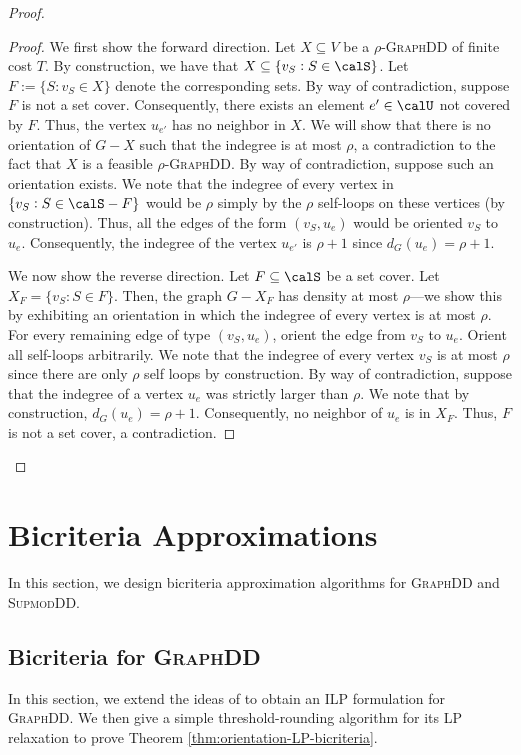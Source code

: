 \documentclass{article}
\newcommand{\densitydeletionset}{\textsc{GraphDD}\xspace}
\newcommand{\supmoddensitydeletionset}{\textsc{SupmodDD}\xspace}
\begin{document}
\begin{proof}
\begin{proof}
    We first show the forward direction. Let $X \subseteq V$ be a $\rho$-\densitydeletionset of finite cost $T$. By construction, we have that $X \subseteq \{v_S : S \in \calS\}$. Let $F := \{S : v_S \in X\}$ denote the corresponding sets. By way of contradiction, suppose $F$ is not a set cover. Consequently, there exists an element $e' \in \calU$ not covered by $F$. Thus, the vertex $u_{e'}$ has no neighbor in $X$. We will show that there is no orientation of $G - X$ such that the indegree is at most $\rho$, a contradiction to the fact that $X$ is a feasible $\rho$-\densitydeletionset. By way of contradiction, suppose such an orientation exists. We note that the indegree of every vertex in $\{v_S : S \in \calS - F\}$ would be $\rho$ simply by the $\rho$ self-loops on these vertices (by construction). Thus, all the edges of the form $(v_S, u_e)$ would be oriented $v_S$ to $u_e$. Consequently, the indegree of the vertex $u_{e'}$ is $\rho+1$ since $d_G(u_e) = \rho+1$.

    We now show the reverse direction. Let $F \subseteq \calS$ be a set cover. Let $X_F = \{v_S : S \in F\}$. Then, the graph $G - X_F$ has density at most $\rho$---we show this by exhibiting an orientation in which the indegree of every vertex is at most $\rho$. For every remaining edge of type $(v_S, u_e)$, orient the edge from $v_S$ to $u_e$. Orient all self-loops arbitrarily. We note that the indegree of every vertex $v_S$ is at most $\rho$ since there are only $\rho$ self loops by construction. By way of contradiction, suppose that the indegree of a vertex $u_e$ was strictly larger than $\rho$. We note that by construction, $d_G(u_e) = \rho+1$. Consequently, no neighbor of $u_e$ is in $X_F$. Thus, $F$ is not a set cover, a contradiction.
\end{proof}
\end{proof}
\fi

%
 \section{Bicriteria Approximations}\label{sec:bicriteria-algorithm}
In this section, we design bicriteria approximation algorithms for \densitydeletionset and \supmoddensitydeletionset.

\subsection{Bicriteria for \densitydeletionset}\label{sec:orientation-bicriteria}

In this section, we extend the ideas of \cite{chandrasekaran2024polyhedralaspectsfeedbackvertex} to obtain an ILP formulation for \densitydeletionset. We then give a simple threshold-rounding algorithm for its LP relaxation to prove Theorem \ref{thm:orientation-LP-bicriteria}. 
\end{document}
